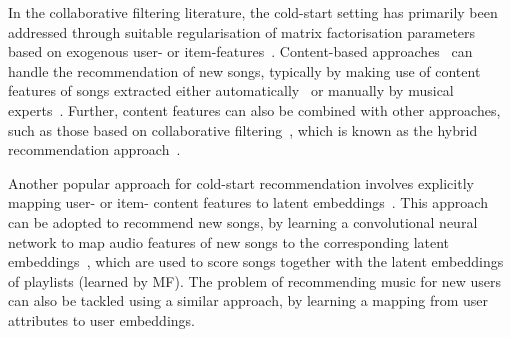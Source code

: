 In the collaborative filtering literature,
the cold-start setting has primarily been addressed through
suitable regularisation of matrix factorisation parameters
based on exogenous user- or item-features~\cite{Ma:2008,Agarwal:2009,Cao:2010}.
%
Content-based approaches~\cite[chap. 4]{aggarwal2016recommender}
can handle the recommendation of new songs,
typically by making use of content features of songs extracted either automatically~\cite{seyerlehner2010automatic,eghbal2015vectors}
or manually by musical experts~\cite{john2006pandora}.
Further, content features can also be combined with other approaches, such as those based on 
collaborative filtering~\cite{yoshii2006hybrid,donaldson2007hybrid,shao2009music},
which is known as the hybrid recommendation approach~\cite{burke2002hybrid,aggarwal2016recommender}.
%

Another popular approach for cold-start recommendation involves explicitly mapping 
user- or item- content features to latent embeddings~\cite{Gantner:2010}.
This approach can be adopted to recommend new songs, 
\eg by learning a convolutional neural network to map audio features of new songs to 
the corresponding latent embeddings~\cite{van2013deep},
which are %
used to score songs together with the latent embeddings of playlists (learned by MF). %
The problem of recommending music for new users can also be tackled using a similar approach, \eg
by learning a mapping from user attributes to user embeddings.

